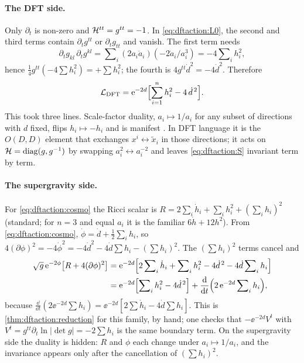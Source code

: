 \paragraph{The DFT side.} Only $\partial_t$ is non-zero and $\mathcal{H}^{tt}=g^{tt}=-1$. In
\eqref{eq:dftaction:L0}, the second and third terms contain $\partial_tg^{tt}$ or
$\partial_tg_{tt}$ and vanish. The first term needs
\[
\partial_tg_{kl}\,\partial_tg^{kl}=\sum\nolimits_i(2a_i\dot a_i)(-2\dot a_i/a_i^3)=
-4\sum\nolimits_ih_i^2,
\]
hence $\tfrac14g^{tt}(-4\sum h_i^2)=+\sum h_i^2$; the fourth is $4g^{tt}\dot d^2=-4\dot d^2$. Therefore
\begin{equation}\label{eq:dftaction:Lcosmo}
\mathcal L_{\text{DFT}}=\mathrm{e}^{-2d}\Bigl[\sum_{i=1}^nh_i^2-4\,\dot d^{\,2}\Bigr].
\end{equation}
This took three lines. Scale-factor duality, $a_i\mapsto1/a_i$ for
any subset of directions with $d$ fixed, flips $h_i\mapsto-h_i$ and is manifest
. In DFT language it is the $O(D,D)$ element that exchanges
$x^i\leftrightarrow\tilde x_i$ in those directions; it acts on $\mathcal{H}=\operatorname{diag}(g,g^{-1})$ by swapping
$a_i^2\leftrightarrow a_i^{-2}$ and leaves \eqref{eq:dftaction:S} invariant term by term.

\paragraph{The supergravity side.} For \eqref{eq:dftaction:cosmo} the Ricci scalar is
$R=2\sum_i\dot h_i+\sum_ih_i^2+(\sum_ih_i)^2$ (standard; for $n=3$ and equal $a_i$ it is the
familiar $6\dot h+12h^2$). From \eqref{eq:dftaction:cosmo}, $\dot\phi=\dot d+\tfrac12\sum_ih_i$,
so $4(\partial\phi)^2=-4\dot\phi^2=-4\dot d^2-4\dot d\sum h_i-(\sum h_i)^2$. The
$(\sum h_i)^2$ terms cancel and
\begin{align*}
\sqrt g\,\mathrm{e}^{-2\phi}\bigl[R+4(\partial\phi)^2\bigr]
&=\mathrm{e}^{-2d}\Bigl[2\sum\nolimits_i\dot h_i+\sum\nolimits_ih_i^2-4\dot d^{\,2}
-4\dot d\sum\nolimits_ih_i\Bigr]\\
&=\mathrm{e}^{-2d}\Bigl[\sum\nolimits_ih_i^2-4\dot d^{\,2}\Bigr]+\frac{\mathrm{d}}{\mathrm{d} t}\Bigl(2\,\mathrm{e}^{-2d}
\sum\nolimits_ih_i\Bigr),
\end{align*}
because $\frac{\dd}{\dd t}(2\ee^{-2d}\sum h_i)=\ee^{-2d}[2\sum\dot h_i-4\dot d\sum h_i]$. This is
\cref{thm:dftaction:reduction} for this family, by hand; one checks that $-\ee^{-2d}V^t$ with
$V^t=g^{tt}\partial_t\ln|\det g|=-2\sum h_i$ is the same boundary term. On the supergravity side
the duality is hidden: $R$ and $\phi$ each change under $a_i\mapsto1/a_i$, and the invariance
appears only after the cancellation of $(\sum h_i)^2$.

